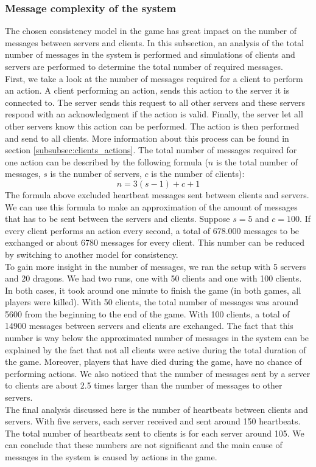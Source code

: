 	\subsubsection{Message complexity of the system}
	\label{subsubsec:nummessages}
		The chosen consistency model in the game has great impact on the number of messages between servers and clients. 
		In this subsection, an analysis of the total number of messages in the system is performed and simulations of clients and servers are performed to determine the total number of required messages.\\
		First, we take a look at the number of messages required for a client to perform an action. 
		A client performing an action, sends this action to the server it is connected to. 
		The server sends this request to all other servers and these servers respond with an acknowledgment if the action is valid. 
		Finally, the server let all other servers know this action can be performed. 
		The action is then performed and send to all clients. 
		More information about this process can be found in section \ref{subsubsec:clients_actions}. 
		The total number of messages required for one action can be described by the following formula ($ n $ is the total number of messages, $ s $ is the number of servers, $ c $ is the number of clients):
		$$ n = 3(s - 1) + c + 1 $$
		The formula above excluded heartbeat messages sent between clients and servers.
		We can use this formula to make an approximation of the amount of messages that has to be sent between the servers and clients. 
		Suppose $ s = 5 $ and $ c = 100 $. 
		If every client performs an action every second, a total of 678.000 messages to be exchanged or about 6780 messages for every client. 
		This number can be reduced by switching to another model for consistency.\\
		To gain more insight in the number of messages, we ran the setup with 5 servers and 20 dragons. 
		We had two runs, one with 50 clients and one with 100 clients. 
		In both cases, it took around one minute to finish the game (in both games, all players were killed). 
		With 50 clients, the total number of messages was around 5600 from the beginning to the end of the game. 
		With 100 clients, a total of 14900 messages between servers and clients are exchanged. 
		The fact that this number is way below the approximated number of messages in the system can be explained by the fact that not all clients were active during the total duration of the game. 
		Moreover, players that have died during the game, have no chance of performing actions. We also noticed that the number of messages sent by a server to clients are about 2.5 times larger than the number of messages to other servers.\\
		The final analysis discussed here is the number of heartbeats between clients and servers. 
		With five servers, each server received and sent around 150 heartbeats. 
		The total number of heartbeats sent to clients is for each server around 105. 
		We can conclude that these numbers are not significant and the main cause of messages in the system is caused by actions in the game.

